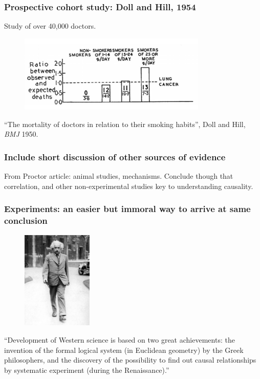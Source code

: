 \documentclass[handout]{beamer}
\begin{document}
\begin{frame}
	\frametitle{Prospective cohort study: Doll and Hill, 1954}
	
	Study of over 40,000 doctors.
	
	\begin{figure}[ht]
		\centerline{\includegraphics[width=0.8\textwidth]{../figures/doll_hill_1954.pdf}}
	\end{figure}
	
	\footnotesize ``The mortality of doctors in relation to their smoking habits'', Doll and Hill, \textit{BMJ} 1950.
	
\end{frame}

\begin{frame}
	\frametitle{Include short discussion of other sources of evidence}
	
	From Proctor article: animal studies, mechanisms. Conclude though that correlation, and other non-experimental studies key to understanding causality.
	
\end{frame}

\begin{frame}
	\frametitle{Experiments: an easier but immoral way to arrive at same conclusion}
	
	\begin{figure}[ht]
		\centerline{\includegraphics[width=0.3\textwidth]{../figures/einstein_oxford.jpeg}}
	\end{figure}
	
	``Development of Western science is based on two great achievements: the invention of the formal logical system (in Euclidean geometry) by the Greek philosophers, and the discovery of the possibility to find out causal relationships by systematic experiment (during the Renaissance).''
	
\end{frame}
\end{document}
